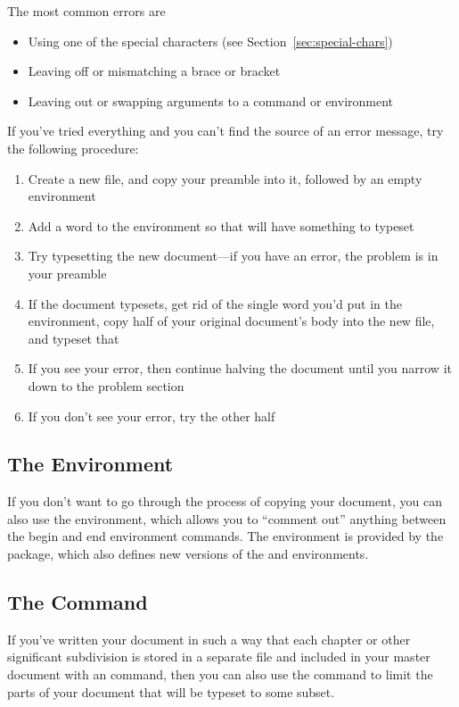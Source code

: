 The most common errors are
\begin{itemize}
\item Using one of the special characters (see
Section~\ref{sec:special-chars})
\item Leaving off or mismatching a brace or bracket
\item Leaving out or swapping arguments to a command or environment
\end{itemize}

If you've tried everything and you can't find the source of an error
message, try the following procedure:
\begin{enumerate}
\item Create a new file, and copy your preamble into it, followed by
  an empty  environment
\item Add a word to the  environment so that \tex will
  have something to typeset
\item Try typesetting the new document---if you have an error, the
  problem is in your preamble
\item If the document typesets, get rid of the single word you'd put
  in the  environment, copy half of your original
  document's body into the new file, and typeset that
\item If you see your error, then continue halving the document until
  you narrow it down to the problem section
\item If you don't see your error, try the other half
\end{enumerate}

\subsection{The \protect{} Environment}

If you don't want to go through the process of copying your document,
you can also use the  environment, which allows you to
``comment out'' anything between the begin and end environment
commands.  The  environment is provided by the
 package, which also defines new versions of the
 and  environments.

\subsection{The \protect{} Command}

If you've written your document in such a way that each chapter or
other significant subdivision is stored in a separate file and
included in your master document with an  command,
then you can also use the  command to limit the
parts of your document that will be typeset to some subset.

